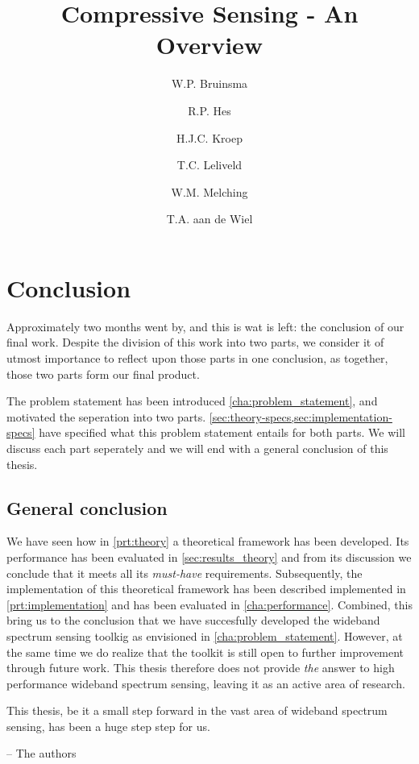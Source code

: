 \documentclass[a4paper, openany, oneside]{memoir}
\title{Compressive Sensing - An Overview}
\author{W.P. Bruinsma \and R.P. Hes \and H.J.C. Kroep \and T.C. Leliveld \and W.M. Melching \and T.A. aan de Wiel}
\begin{document}
\chapter{Conclusion}


Approximately two months went by, and this is wat is left: the conclusion of our final work. Despite the division of this work into two parts, we consider it of utmost importance to reflect upon those parts in one conclusion, as together, those two parts form our final product. 

The problem statement has been introduced \cref{cha:problem_statement}, and motivated the seperation into two parts. \cref{sec:theory-specs,sec:implementation-specs} have specified what this problem statement entails for both parts. We will discuss each part seperately and we will end with a general conclusion of this thesis.

\section{General conclusion}
We have seen how in \cref{prt:theory} a theoretical framework has been developed. Its performance has been evaluated in \cref{sec:results_theory} and from its discussion we conclude that it meets all its \emph{must-have} requirements. Subsequently, the implementation of this theoretical framework has been described implemented in \cref{prt:implementation} and has been evaluated in \cref{cha:performance}. Combined, this bring us to the conclusion that we have succesfully developed the wideband spectrum sensing toolkig as envisioned in \cref{cha:problem_statement}. However, at the same time we do realize that the toolkit is still open to further improvement through future work. This thesis therefore does not provide \emph{the} answer to high performance wideband spectrum sensing, leaving it as an active area of research. 

This thesis, be it a small step forward in the vast area of wideband spectrum sensing, has been a huge step step for us.%

\raggedleft -- The authors \qquad\qquad\qquad
\end{document}
